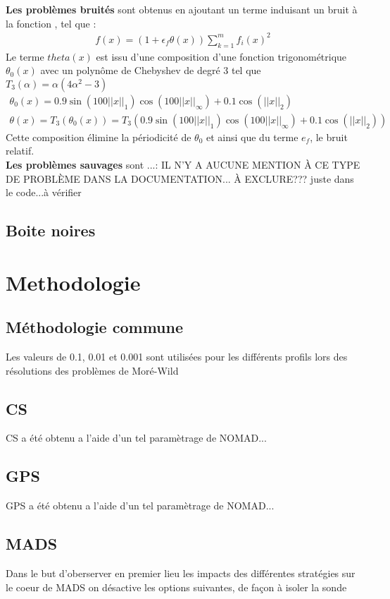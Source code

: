 \documentclass[letterpaper]{scrartcl}
\begin{document}
\textbf{Les problèmes bruités} sont obtenus en ajoutant un terme induisant un bruit à la fonction , tel que : 
\begin{gather*}
f(x)=(1+\epsilon_{f}\theta(x))\sum_{k=1}^{m}{f_{i}(x)^{2}}
\end{gather*}
Le terme $theta(x)$ est issu d'une composition d'une fonction trigonométrique $\theta_0(x)$ avec un polynôme de Chebyshev de degré 3 tel que $T_{3}(\alpha) = \alpha(4\alpha^{2}-3)$
\begin{gather*}
\theta_0(x)=0.9\sin(100||x||_{1})\cos(100||x||_\infty)+0.1\cos(||x||_2) \\
\theta(x) = T_3(\theta_0(x)) = T_{3}(0.9\sin(100||x||_{1})\cos(100||x||_\infty)+0.1\cos(||x||_2))
\end{gather*} 
Cette composition élimine la périodicité de $\theta_{0}$ et ainsi que du terme $e_f$, le bruit relatif.  \\
\textbf{Les problèmes sauvages} sont ...: IL N'Y A AUCUNE MENTION À CE TYPE DE PROBLÈME DANS LA DOCUMENTATION... À EXCLURE??? juste dans le code...à vérifier
\subsection{Boite noires}
\section{Methodologie}
	\subsection{Méthodologie commune}
	Les valeurs de 0.1, 0.01 et 0.001 sont utilisées pour les différents profils lors des résolutions des problèmes de Moré-Wild\clearpage
	\subsection{CS}
	CS a été obtenu a l'aide d'un tel paramètrage de NOMAD...
	\subsection{GPS}
	GPS a été obtenu a l'aide d'un tel paramètrage de NOMAD...
	\subsection{MADS}
	Dans le but d'oberserver en premier lieu les impacts des différentes stratégies sur le coeur de MADS on désactive les options suivantes, de façon à isoler la sonde
\end{document}
